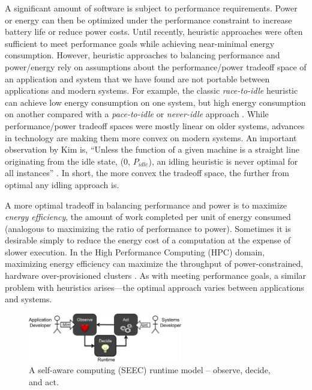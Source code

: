 A significant amount of software is subject to performance requirements.
Power or energy can then be optimized under the performance constraint to increase battery life or reduce power costs.
Until recently, heuristic approaches were often sufficient to meet performance goals while achieving near-minimal energy consumption.
However, heuristic approaches to balancing performance and power/energy rely on assumptions about the performance/power tradeoff space of an application and system that we have found are not portable between applications and modern systems.
For example, the classic \emph{race-to-idle} heuristic can achieve low energy consumption on one system, but high energy consumption on another compared with a \emph{pace-to-idle} or \emph{never-idle} approach \cite{Imes2014}.
While performance/power tradeoff spaces were mostly linear on older systems, advances in technology are making them more convex on modern systems.
An important observation by Kim \etal is, ``Unless the function of a given machine is a straight line originating from the idle state, (0, $P_{idle}$), an idling heuristic is never optimal for all instances'' \cite{kim-cpsna2015}.
In short, the more convex the tradeoff space, the further from optimal any idling approach is.

A more optimal tradeoff in balancing performance and power is to maximize \emph{energy efficiency}, \ie the amount of work completed per unit of energy consumed (analogous to maximizing the ratio of performance to power).
Sometimes it is desirable simply to reduce the energy cost of a computation at the expense of slower execution.
In the High Performance Computing (HPC) domain, maximizing energy efficiency can maximize the throughput of power-constrained, hardware over-provisioned clusters \cite{PatkiRMAP}.
As with meeting performance goals, a similar problem with heuristics arises---the optimal approach varies between applications and systems.


\begin{figure}[t]
  \begin{centering}
  \includegraphics[width=0.6\textwidth]{figs/SEEC.png}
  \caption{A self-aware computing (SEEC) runtime model -- observe, decide, and act.}
  \label{fig:seec}
  \end{centering}
\end{figure}

